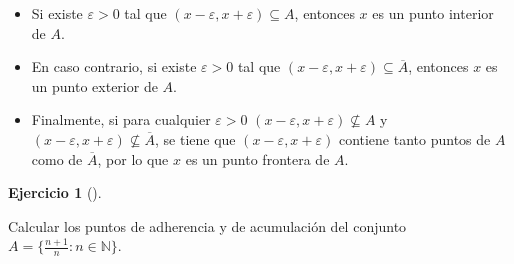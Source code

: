 \documentclass[
  a4paper,
]{scrreport}
\providecommand{\tightlist}{%
  \setlength{\itemsep}{0pt}\setlength{\parskip}{0pt}}\usepackage{longtable,booktabs,array}
\theoremstyle{definition}
\newtheorem{exercise}{Ejercicio}[chapter]
\theoremstyle{remark}
\begin{document}
\begin{tcolorbox}
\begin{itemize}
\tightlist
\item
  Si existe \(\varepsilon>0\) tal que
  \((x-\varepsilon, x+\varepsilon)\subseteq A\), entonces \(x\) es un
  punto interior de \(A\).
\item
  En caso contrario, si existe \(\varepsilon>0\) tal que
  \((x-\varepsilon, x+\varepsilon)\subseteq \overline{A}\), entonces
  \(x\) es un punto exterior de \(A\).
\item
  Finalmente, si para cualquier \(\varepsilon>0\)
  \((x-\varepsilon, x+\varepsilon)\not\subseteq A\) y
  \((x-\varepsilon, x+\varepsilon)\not\subseteq \overline{A}\), se tiene
  que \((x-\varepsilon, x+\varepsilon)\) contiene tanto puntos de \(A\)
  como de \(\overline{A}\), por lo que \(x\) es un punto frontera de
  \(A\).
\end{itemize}

\end{tcolorbox}

\leavevmode{}%
\begin{exercise}[]\label{exr-particion-interior-exterior-frontera}

Calcular los puntos de adherencia y de acumulación del conjunto
\(A=\{\frac{n+1}{n}:n\in\mathbb{N}\}\).

\end{exercise}
\end{document}
